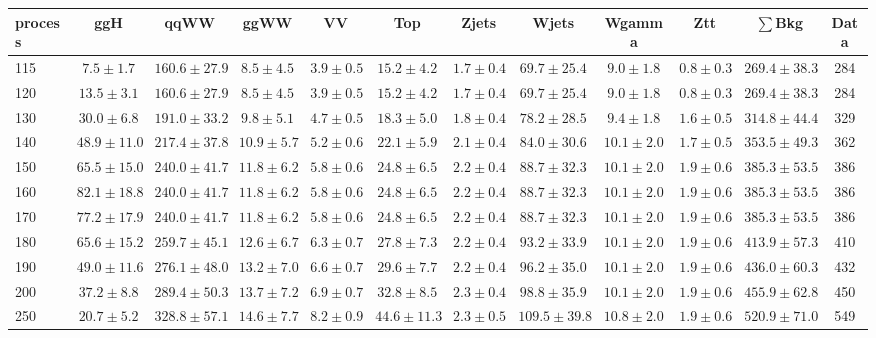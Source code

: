 \begin{table}
{\tiny
 \begin{center}
 \begin{tabular}{l c c c c c c c c c c c }
 \hline
 process & ggH & qqWW & ggWW & VV & Top & Zjets & Wjets & Wgamma & Ztt & $\sum$Bkg & Data \\
 \hline
115 & $7.5\pm1.7$ & $160.6\pm27.9$ & $8.5\pm4.5$ & $3.9\pm0.5$ & $15.2\pm4.2$ & $1.7\pm0.4$ & $69.7\pm25.4$ & $9.0\pm1.8$ & $0.8\pm0.3$ & $269.4\pm38.3$ & 284 \\
120 & $13.5\pm3.1$ & $160.6\pm27.9$ & $8.5\pm4.5$ & $3.9\pm0.5$ & $15.2\pm4.2$ & $1.7\pm0.4$ & $69.7\pm25.4$ & $9.0\pm1.8$ & $0.8\pm0.3$ & $269.4\pm38.3$ & 284 \\
130 & $30.0\pm6.8$ & $191.0\pm33.2$ & $9.8\pm5.1$ & $4.7\pm0.5$ & $18.3\pm5.0$ & $1.8\pm0.4$ & $78.2\pm28.5$ & $9.4\pm1.8$ & $1.6\pm0.5$ & $314.8\pm44.4$ & 329 \\
140 & $48.9\pm11.0$ & $217.4\pm37.8$ & $10.9\pm5.7$ & $5.2\pm0.6$ & $22.1\pm5.9$ & $2.1\pm0.4$ & $84.0\pm30.6$ & $10.1\pm2.0$ & $1.7\pm0.5$ & $353.5\pm49.3$ & 362 \\
150 & $65.5\pm15.0$ & $240.0\pm41.7$ & $11.8\pm6.2$ & $5.8\pm0.6$ & $24.8\pm6.5$ & $2.2\pm0.4$ & $88.7\pm32.3$ & $10.1\pm2.0$ & $1.9\pm0.6$ & $385.3\pm53.5$ & 386 \\
160 & $82.1\pm18.8$ & $240.0\pm41.7$ & $11.8\pm6.2$ & $5.8\pm0.6$ & $24.8\pm6.5$ & $2.2\pm0.4$ & $88.7\pm32.3$ & $10.1\pm2.0$ & $1.9\pm0.6$ & $385.3\pm53.5$ & 386 \\
170 & $77.2\pm17.9$ & $240.0\pm41.7$ & $11.8\pm6.2$ & $5.8\pm0.6$ & $24.8\pm6.5$ & $2.2\pm0.4$ & $88.7\pm32.3$ & $10.1\pm2.0$ & $1.9\pm0.6$ & $385.3\pm53.5$ & 386 \\
180 & $65.6\pm15.2$ & $259.7\pm45.1$ & $12.6\pm6.7$ & $6.3\pm0.7$ & $27.8\pm7.3$ & $2.2\pm0.4$ & $93.2\pm33.9$ & $10.1\pm2.0$ & $1.9\pm0.6$ & $413.9\pm57.3$ & 410 \\
190 & $49.0\pm11.6$ & $276.1\pm48.0$ & $13.2\pm7.0$ & $6.6\pm0.7$ & $29.6\pm7.7$ & $2.2\pm0.4$ & $96.2\pm35.0$ & $10.1\pm2.0$ & $1.9\pm0.6$ & $436.0\pm60.3$ & 432 \\
200 & $37.2\pm8.8$ & $289.4\pm50.3$ & $13.7\pm7.2$ & $6.9\pm0.7$ & $32.8\pm8.5$ & $2.3\pm0.4$ & $98.8\pm35.9$ & $10.1\pm2.0$ & $1.9\pm0.6$ & $455.9\pm62.8$ & 450 \\
250 & $20.7\pm5.2$ & $328.8\pm57.1$ & $14.6\pm7.7$ & $8.2\pm0.9$ & $44.6\pm11.3$ & $2.3\pm0.5$ & $109.5\pm39.8$ & $10.8\pm2.0$ & $1.9\pm0.6$ & $520.9\pm71.0$ & 549 \\

\end{tabular}
\end{center}}
\end{table}
